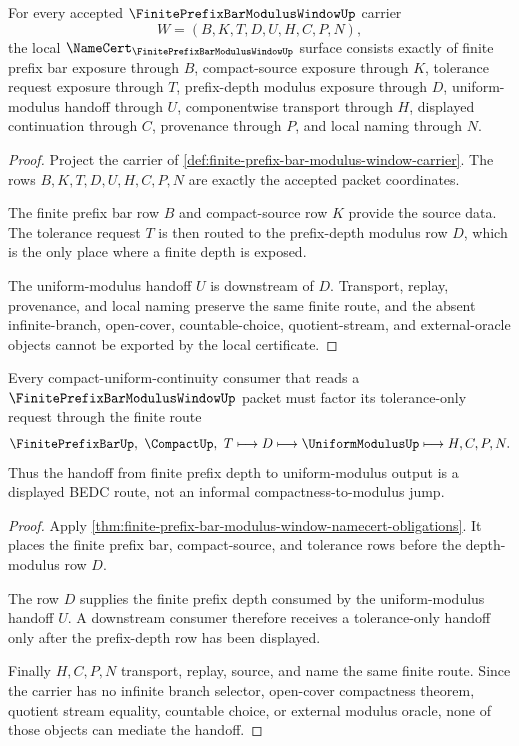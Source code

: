\begin{theorem}
\label{thm:finite-prefix-bar-modulus-window-namecert-obligations}
For every accepted $\FinitePrefixBarModulusWindowUp$ carrier
$$
W=(B,K,T,D,U,H,C,P,N),
$$
the local $\NameCert_{\FinitePrefixBarModulusWindowUp}$ surface consists exactly of finite prefix bar exposure through $B$, compact-source exposure through $K$, tolerance request exposure through $T$, prefix-depth modulus exposure through $D$, uniform-modulus handoff through $U$, componentwise transport through $H$, displayed continuation through $C$, provenance through $P$, and local naming through $N$.
\end{theorem}
\begin{proof}
Project the carrier of \autoref{def:finite-prefix-bar-modulus-window-carrier}. The rows $B,K,T,D,U,H,C,P,N$ are exactly the accepted packet coordinates.

The finite prefix bar row $B$ and compact-source row $K$ provide the source data. The tolerance request $T$ is then routed to the prefix-depth modulus row $D$, which is the only place where a finite depth is exposed.

The uniform-modulus handoff $U$ is downstream of $D$. Transport, replay, provenance, and local naming preserve the same finite route, and the absent infinite-branch, open-cover, countable-choice, quotient-stream, and external-oracle objects cannot be exported by the local certificate.
\end{proof}

\begin{theorem}
\label{thm:finite-prefix-bar-modulus-window-handoff}
Every compact-uniform-continuity consumer that reads a $\FinitePrefixBarModulusWindowUp$ packet must factor its tolerance-only request through the finite route
$$
\FinitePrefixBarUp,\ \CompactUp,\ T
\longmapsto
D
\longmapsto
\UniformModulusUp
\longmapsto
H,C,P,N .
$$
Thus the handoff from finite prefix depth to uniform-modulus output is a displayed BEDC route, not an informal compactness-to-modulus jump.
\end{theorem}
\begin{proof}
Apply \autoref{thm:finite-prefix-bar-modulus-window-namecert-obligations}. It places the finite prefix bar, compact-source, and tolerance rows before the depth-modulus row $D$.

The row $D$ supplies the finite prefix depth consumed by the uniform-modulus handoff $U$. A downstream consumer therefore receives a tolerance-only handoff only after the prefix-depth row has been displayed.

Finally $H,C,P,N$ transport, replay, source, and name the same finite route. Since the carrier has no infinite branch selector, open-cover compactness theorem, quotient stream equality, countable choice, or external modulus oracle, none of those objects can mediate the handoff.
\end{proof}

